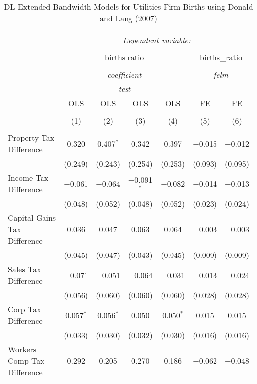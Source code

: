 
\begin{table}[!htbp] \centering 
  \caption{DL Extended Bandwidth Models for  Utilities Firm Births using Donald and Lang (2007)} 
  \label{} 
\begin{tabular}{@{\extracolsep{5pt}}lcccccc} 
\\[-1.8ex]\hline 
\hline \\[-1.8ex] 
 & \multicolumn{6}{c}{\textit{Dependent variable:}} \\ 
\cline{2-7} 
\\[-1.8ex] & \multicolumn{4}{c}{births ratio} & \multicolumn{2}{c}{births\_ratio} \\ 
\\[-1.8ex] & \multicolumn{4}{c}{\textit{coefficient}} & \multicolumn{2}{c}{\textit{felm}} \\ 
 & \multicolumn{4}{c}{\textit{test}} & \multicolumn{2}{c}{\textit{}} \\ 
 & OLS & OLS & OLS & OLS & FE & FE \\ 
\\[-1.8ex] & (1) & (2) & (3) & (4) & (5) & (6)\\ 
\hline \\[-1.8ex] 
 Property Tax Difference & 0.320 & 0.407$^{*}$ & 0.342 & 0.397 & $-$0.015 & $-$0.012 \\ 
  & (0.249) & (0.243) & (0.254) & (0.253) & (0.093) & (0.095) \\ 
  Income Tax Difference & $-$0.061 & $-$0.064 & $-$0.091$^{*}$ & $-$0.082 & $-$0.014 & $-$0.013 \\ 
  & (0.048) & (0.052) & (0.048) & (0.052) & (0.023) & (0.024) \\ 
  Capital Gains Tax Difference & 0.036 & 0.047 & 0.063 & 0.064 & $-$0.003 & $-$0.003 \\ 
  & (0.045) & (0.047) & (0.043) & (0.045) & (0.009) & (0.009) \\ 
  Sales Tax Difference & $-$0.071 & $-$0.051 & $-$0.064 & $-$0.031 & $-$0.013 & $-$0.024 \\ 
  & (0.056) & (0.060) & (0.060) & (0.060) & (0.028) & (0.028) \\ 
  Corp Tax Difference & 0.057$^{*}$ & 0.056$^{*}$ & 0.050 & 0.050$^{*}$ & 0.015 & 0.015 \\ 
  & (0.033) & (0.030) & (0.032) & (0.030) & (0.016) & (0.016) \\ 
  Workers Comp Tax Difference & 0.292 & 0.205 & 0.270 & 0.186 & $-$0.062 & $-$0.048 \\ 

\end{tabular}
\end{table}
